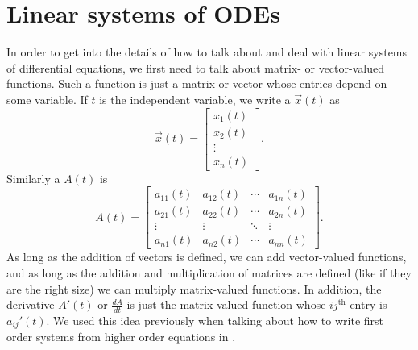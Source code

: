 \section{Linear systems of ODEs}
\label{linsystems:section}



In order to get into the details of how to talk about and deal with linear systems of differential equations, we first need to talk about matrix- or vector-valued functions.  
Such a function is
just a matrix or vector whose entries depend on some variable.
If $t$ is the independent variable, we write a
\emph{}
$\vec{x}(t)$ as
\begin{equation*}
\vec{x}(t) = \begin{bmatrix}
x_1(t) \\
x_2(t) \\
\vdots \\
x_n(t)
\end{bmatrix} .
\end{equation*}
Similarly a \emph{} $A(t)$ is
\begin{equation*}
A(t) =
\begin{bmatrix}
a_{11}(t) & a_{12}(t) & \cdots & a_{1n}(t) \\
a_{21}(t) & a_{22}(t) & \cdots & a_{2n}(t) \\
\vdots & \vdots & \ddots & \vdots \\
a_{n1}(t) & a_{n2}(t) & \cdots & a_{nn}(t)
\end{bmatrix} .
\end{equation*}
As long as the addition of vectors is defined, we can add vector-valued functions, and as long as the addition and multiplication of matrices are defined (like if they are the right size) we can multiply matrix-valued functions. In addition, the derivative $A'(t)$ or $\frac{dA}{dt}$ is
just the matrix-valued function
whose $ij^{\text{th}}$ entry is $a_{ij}'(t)$. We used this idea previously when talking about how to write first order systems from higher order equations in .

